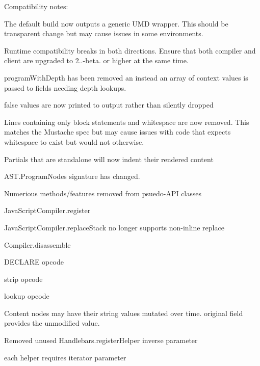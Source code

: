 Compatibility notes\+:
\begin{DoxyItemize}
\item The default build now outputs a generic U\+MD wrapper. This should be transparent change but may cause issues in some environments.
\item Runtime compatibility breaks in both directions. Ensure that both compiler and client are upgraded to 2..-\/beta. or higher at the same time.
\begin{DoxyItemize}
\item {\ttfamily program\+With\+Depth} has been removed an instead an array of context values is passed to fields needing depth lookups.
\end{DoxyItemize}
\item {\ttfamily false} values are now printed to output rather than silently dropped
\item Lines containing only block statements and whitespace are now removed. This matches the Mustache spec but may cause issues with code that expects whitespace to exist but would not otherwise.
\item Partials that are standalone will now indent their rendered content
\item {\ttfamily A\+S\+T.\+Program\+Node}\textquotesingle{}s signature has changed.
\item Numerious methods/features removed from psuedo-\/\+A\+PI classes
\begin{DoxyItemize}
\item {\ttfamily Java\+Script\+Compiler.\+register}
\item {\ttfamily Java\+Script\+Compiler.\+replace\+Stack} no longer supports non-\/inline replace
\item {\ttfamily Compiler.\+disassemble}
\item {\ttfamily D\+E\+C\+L\+A\+RE} opcode
\item {\ttfamily strip} opcode
\item {\ttfamily lookup} opcode
\item Content nodes may have their {\ttfamily string} values mutated over time. {\ttfamily original} field provides the unmodified value.
\end{DoxyItemize}
\item Removed unused {\ttfamily Handlebars.\+register\+Helper} {\ttfamily inverse} parameter
\item {\ttfamily each} helper requires iterator parameter
\end{DoxyItemize}

